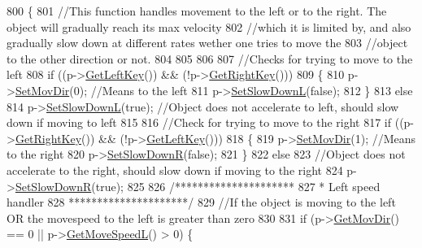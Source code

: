 \begin{DoxyCode}
800                                                                                     \{
801     \textcolor{comment}{//This function handles movement to the left or to the right. The object will gradually reach its max
       velocity}
802     \textcolor{comment}{//which it is limited by, and also gradually slow down at different rates wether one tries to move the}
803     \textcolor{comment}{//object to the other direction or not.}
804 
805 
806 
807     \textcolor{comment}{//Checks for trying to move to the left}
808     \textcolor{keywordflow}{if} ((p->\hyperlink{classPrincessObject_a3fd4789c53bba5edefc21dfc369684cf}{GetLeftKey}()) && (!p->\hyperlink{classPrincessObject_af17205e238755baf440cc8c7af5134ea}{GetRightKey}()))
809     \{
810         p->\hyperlink{classPrincessObject_a536f5945b6202535fd210663f335d835}{SetMovDir}(0); \textcolor{comment}{//Means to the left}
811         p->\hyperlink{classPrincessObject_ade14bf665247079cd377f7c076c0b565}{SetSlowDownL}(\textcolor{keyword}{false});
812     \}
813     \textcolor{keywordflow}{else}
814         p->\hyperlink{classPrincessObject_ade14bf665247079cd377f7c076c0b565}{SetSlowDownL}(\textcolor{keyword}{true}); \textcolor{comment}{//Object does not accelerate to left, should slow down if moving
       to left}
815 
816     \textcolor{comment}{//Check for trying to move to the right}
817     \textcolor{keywordflow}{if} ((p->\hyperlink{classPrincessObject_af17205e238755baf440cc8c7af5134ea}{GetRightKey}()) && (!p->\hyperlink{classPrincessObject_a3fd4789c53bba5edefc21dfc369684cf}{GetLeftKey}()))
818     \{
819         p->\hyperlink{classPrincessObject_a536f5945b6202535fd210663f335d835}{SetMovDir}(1); \textcolor{comment}{//Means to the right}
820         p->\hyperlink{classPrincessObject_aec424f4e58610f68d67da368b6489829}{SetSlowDownR}(\textcolor{keyword}{false});
821     \}
822     \textcolor{keywordflow}{else}
823         \textcolor{comment}{//Object does not accelerate to the right, should slow down if moving to the right}
824         p->\hyperlink{classPrincessObject_aec424f4e58610f68d67da368b6489829}{SetSlowDownR}(\textcolor{keyword}{true});
825 
826     \textcolor{comment}{/*********************}
827 \textcolor{comment}{     * Left speed handler}
828 \textcolor{comment}{     *********************/}
829     \textcolor{comment}{//If the object is moving to the left OR the movespeed to the left is greater than zero}
830 
831     \textcolor{keywordflow}{if} (p->\hyperlink{classPrincessObject_af0d38acf6140b652a40471efa01c3660}{GetMovDir}() == 0 || p->\hyperlink{classPrincessObject_a10f0fd59ffaadb4fd04195736f62dff0}{GetMoveSpeedL}() > 0) \{

\end{DoxyCode}
